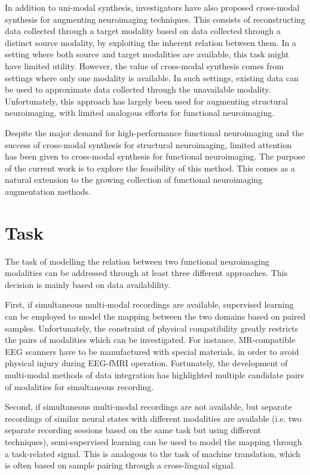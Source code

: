 \documentclass{article}
\begin{document}
In addition to uni-modal synthesis, investigators have also proposed cross-modal synthesis for augmenting neuroimaging techniques. This consists of reconstructing data collected through a target modality based on data collected through a distinct source modality, by exploiting the inherent relation between them. In a setting where both source and target modalities are available, this task might have limited utility. However, the value of cross-modal synthesis comes from settings where only one modality is available. In such settings, existing data can be used to approximate data collected through the unavailable modality. Unfortunately, this approach has largely been used for augmenting structural neuroimaging, with limited analogous efforts for functional neuroimaging.

Despite the major demand for high-performance functional neuroimaging and the success of cross-modal synthesis for structural neuroimaging, limited attention has been given to cross-modal synthesis for functional neuroimaging. The purpose of the current work is to explore the feasibility of this method. This comes as a natural extension to the growing collection of functional neuroimaging augmentation methods.

\section{Task}

The task of modelling the relation between two functional neuroimaging modalities can be addressed through at least three different approaches. This decision is mainly based on data availablility.

First, if simultaneous multi-modal recordings are available, supervised learning can be employed to model the mapping between the two domains based on paired samples. Unfortunately, the constraint of physical compatibility greatly restricts the pairs of modalities which can be investigated. For instance, MR-compatible EEG scanners have to be manufactured with special materials, in order to avoid physical injury during EEG-fMRI operation. Fortunately, the development of multi-modal methods of data integration has highlighted multiple candidate pairs of modalities for simultaneous recording.

Second, if simultaneous multi-modal recordings are not available, but separate recordings of similar neural states with different modalities are available (i.e. two separate recording sessions based on the same task but using different techniques), semi-supervised learning can be used to model the mapping through a task-related signal. This is analogous to the task of machine translation, which is often based on sample pairing through a cross-lingual signal.
\end{document}

